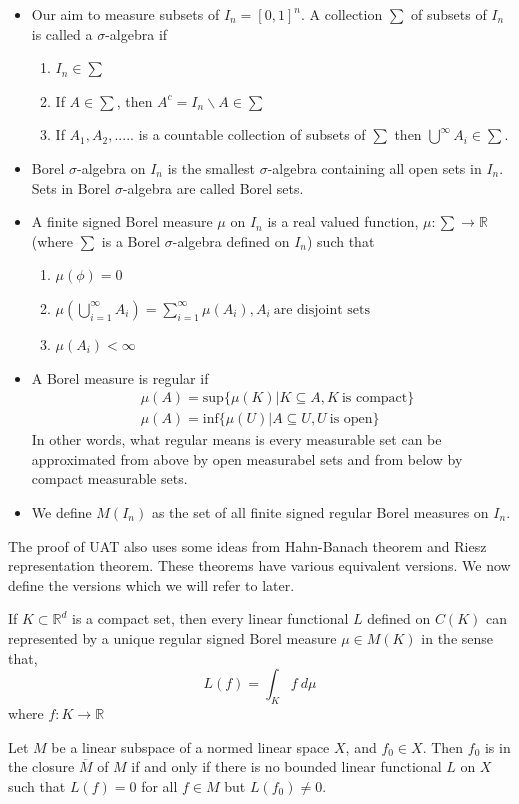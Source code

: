 \begin{itemize}
    \item Our aim to measure subsets of $I_n = [0,1]^n$. A collection $\sum$ of subsets of $I_n$ is called a 
    $\sigma$-algebra if 
    \begin{enumerate}
        \item $I_n \in \sum$
        \item If $A \in \sum$, then $A^c = I_n\backslash A \in \sum$
        \item If $A_1, A_2, .....$ is a countable collection of subsets of $\sum$ then $\bigcup^\infty A_i \in \sum$.
    \end{enumerate}
    \item Borel $\sigma$-algebra on $I_n$ is the smallest $\sigma$-algebra  containing all open sets in $I_n$. Sets in Borel $\sigma$-algebra 
    are called Borel sets.
    \item A finite signed Borel measure $\mu$ on $I_n$ is a real valued  function, $\mu : \sum \rightarrow \mathbb{R}$  (where
    $\sum$ is a Borel $\sigma$-algebra defined on $I_n$) such that 
    \begin{enumerate}
        \item $\mu (\phi) = 0$
        \item $\mu (\bigcup_{i=1}^{\infty} A_i) = \sum_{i=1}^{\infty} \mu(A_i), A_i \ \text{are disjoint sets}$
        \item $\mu(A_i) < \infty$
    \end{enumerate}
    \item A Borel measure is regular if 
    \begin{align*}
        &\mu(A) = \text{sup} \{\mu(K) | K \subseteq A, K \ \text{is compact}\} \\
        &\mu(A) = \text{inf} \{\mu(U) | A \subseteq U, U \ \text{is open}\}
    \end{align*}
    In other words, what regular means is every measurable set can be approximated from above by open measurabel 
    sets and from below by compact measurable sets. 
    \item We define $M(I_n)$ as the set of all finite signed regular Borel measures on $I_n$.
\end{itemize}
The proof of UAT also uses some ideas from Hahn-Banach theorem and Riesz representation theorem. These theorems 
have various equivalent versions. We now define the versions which we will refer to later. 
\begin{thm}
    If $K \subset \mathbb{R}^d$ is a compact set, then every linear functional $L$ defined on
    $C(K)$ can represented by a unique regular signed Borel measure $\mu \in M(K)$ in the sense that,
    $$L(f) = \int_K f \ d\mu$$
    where $f: K \rightarrow \mathbb{R}$
\end{thm}
\begin{thm}
    Let $M$ be a linear subspace of a normed linear space $X$, and $f_0 \in X$. Then $f_0$ is 
    in the closure $\overline{M}$ of $M$ if and only if there is no bounded linear functional 
    $L$ on $X$ such that $L(f) = 0 $ for all $f\in M$ but $L(f_0) \neq 0$.
\end{thm}


